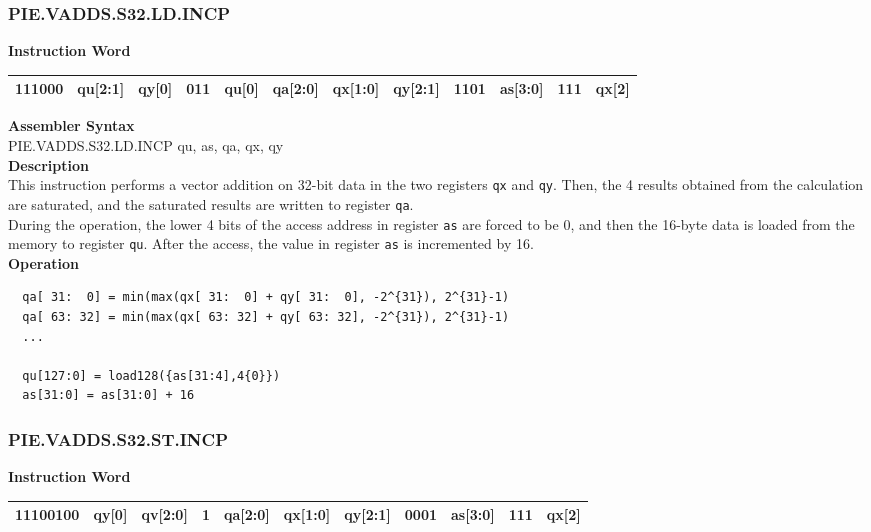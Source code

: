 \newpage
\subsubsection{PIE.VADDS.S32.LD.INCP}\label{instruction:PIEVADDSS32LDINCP}
\setlength\tabcolsep{6pt}
\textbf{Instruction Word} \\
\begin{tabular}{|c|c|c|c|c|c|c|c|c|c|c|c|}
	\hline
	111000 & qu[2:1] & qy[0] & 011 & qu[0] & qa[2:0] & qx[1:0] & qy[2:1] & 1101 & as[3:0] & 111 & qx[2] \\
	\hline
\end{tabular}

\textbf{Assembler Syntax} \\
PIE.VADDS.S32.LD.INCP qu, as, qa, qx, qy \\
\textbf{Description} \\
This instruction performs a vector addition on 32-bit data in the two registers \lstinline{qx} and \lstinline{qy}. Then, the 4 results obtained from the calculation are saturated, and the saturated results are written to register \lstinline{qa}. \\ During the operation, the lower 4 bits of the access address in register \lstinline{as} are forced to be 0, and then the 16-byte data is loaded from the memory to register \lstinline{qu}. After the access, the value in register \lstinline{as} is incremented by 16.\\
\textbf{Operation}
\begin{lstlisting}
  qa[ 31:  0] = min(max(qx[ 31:  0] + qy[ 31:  0], -2^{31}), 2^{31}-1)
  qa[ 63: 32] = min(max(qx[ 63: 32] + qy[ 63: 32], -2^{31}), 2^{31}-1)
  ...

  qu[127:0] = load128({as[31:4],4{0}})
  as[31:0] = as[31:0] + 16
\end{lstlisting}

\newpage
\subsubsection{PIE.VADDS.S32.ST.INCP}\label{instruction:PIEVADDSS32STINCP}
\setlength\tabcolsep{6pt}
\textbf{Instruction Word} \\
\begin{tabular}{|c|c|c|c|c|c|c|c|c|c|c|}
	\hline
	11100100 & qy[0] & qv[2:0] & 1 & qa[2:0] & qx[1:0] & qy[2:1] & 0001 & as[3:0] & 111 & qx[2] \\
	\hline
\end{tabular}

